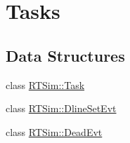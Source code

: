 \hypertarget{group__tasks}{}\section{Tasks}
\label{group__tasks}
\subsection*{Data Structures}
\begin{DoxyCompactItemize}
\item 
class \hyperlink{classRTSim_1_1Task}{R\+T\+Sim\+::\+Task}
\item 
class \hyperlink{classRTSim_1_1DlineSetEvt}{R\+T\+Sim\+::\+Dline\+Set\+Evt}
\item 
class \hyperlink{classRTSim_1_1DeadEvt}{R\+T\+Sim\+::\+Dead\+Evt}
\end{DoxyCompactItemize}
